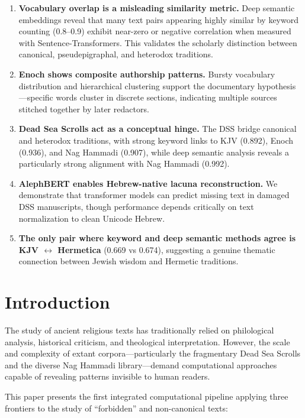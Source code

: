 \documentclass[11pt]{article}
\begin{document}
\begin{enumerate}
    \item \textbf{Vocabulary overlap is a misleading similarity metric.} Deep semantic embeddings reveal that many text pairs appearing highly similar by keyword counting (0.8--0.9) exhibit near-zero or negative correlation when measured with Sentence-Transformers. This validates the scholarly distinction between canonical, pseudepigraphal, and heterodox traditions.
    
    \item \textbf{Enoch shows composite authorship patterns.} Bursty vocabulary distribution and hierarchical clustering support the documentary hypothesis---specific words cluster in discrete sections, indicating multiple sources stitched together by later redactors.
    
    \item \textbf{Dead Sea Scrolls act as a conceptual hinge.} The DSS bridge canonical and heterodox traditions, with strong keyword links to KJV (0.892), Enoch (0.936), and Nag Hammadi (0.907), while deep semantic analysis reveals a particularly strong alignment with Nag Hammadi (0.992).
    
    \item \textbf{AlephBERT enables Hebrew-native lacuna reconstruction.} We demonstrate that transformer models can predict missing text in damaged DSS manuscripts, though performance depends critically on text normalization to clean Unicode Hebrew.
    
    \item \textbf{The only pair where keyword and deep semantic methods agree is KJV $\leftrightarrow$ Hermetica} (0.669 vs 0.674), suggesting a genuine thematic connection between Jewish wisdom and Hermetic traditions.
\end{enumerate}

\section{Introduction}

The study of ancient religious texts has traditionally relied on philological analysis, historical criticism, and theological interpretation. However, the scale and complexity of extant corpora---particularly the fragmentary Dead Sea Scrolls and the diverse Nag Hammadi library---demand computational approaches capable of revealing patterns invisible to human readers.

This paper presents the first integrated computational pipeline applying three frontiers to the study of ``forbidden'' and non-canonical texts:
\end{document}
